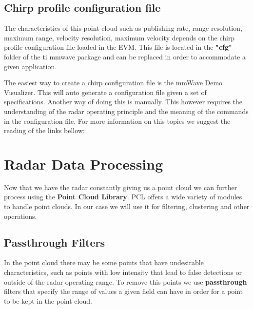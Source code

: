 \documentclass[12pt]{article}
\begin{document}
\subsection{Chirp profile configuration file}
The characteristics of this point cloud such as publishing rate, range resolution, maximum range, velocity resolution, maximum velocity depends on the chirp profile configuration file loaded in the EVM. This file is located in the \textbf{"cfg"} folder of the ti mmwave package and can be replaced in order to accommodate a given application.

The easiest way to create a chirp configuration file is the mmWave Demo Visualizer. This will auto generate a configuration file given a set of specifications.
Another way of doing this is manually. This however requires the understanding of the radar operating principle and the meaning of the commands in the configuration file.
For more information on this topics we suggest the reading of the links bellow:

\section{Radar Data Processing}
Now that we have the radar constantly giving us a point cloud we can further process using the \textbf{Point Cloud Library}. PCL offers a wide variety of modules to handle point clouds. In our case we will use it for filtering, clustering and other operations.
\subsection{Passthrough Filters}
In the point cloud there may be some points that have undesirable characteristics, such as points with low intensity  that lead to false detections or outside of the radar operating range. To remove this points we use \textbf{passthrough} filters that specify the range of values a given field can have in order for a point to be kept in the point cloud. 
\end{document}
